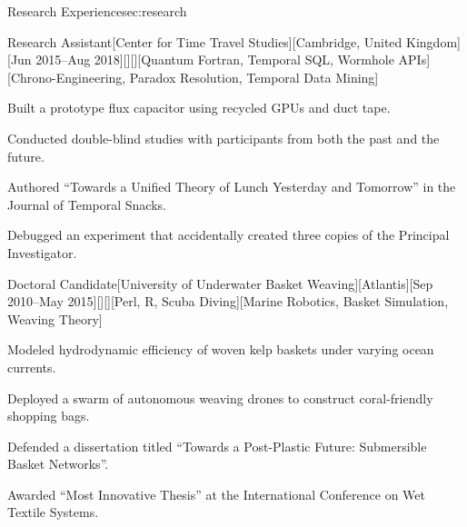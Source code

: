 \documentclass[11pt, letterpaper, extended ]{i-am-developer}
\begin{document}
\begin{devCVSection}{Research Experience}{sec:research}
  \begin{devRole}{Research Assistant}[Center for Time Travel
    Studies][Cambridge, United Kingdom][Jun 2015--Aug
    2018][\faClock][\faMapMarker][Quantum Fortran, Temporal SQL,
    Wormhole APIs][Chrono-Engineering, Paradox Resolution, Temporal Data Mining]
    \begin{devItemize}
    \item Built a prototype flux capacitor using recycled GPUs and duct tape.
    \item Conducted double-blind studies with participants from both
      the past and the future.
    \item Authored “Towards a Unified Theory of Lunch Yesterday and
      Tomorrow” in the Journal of Temporal Snacks.
    \item Debugged an experiment that accidentally created three
      copies of the Principal Investigator.
    \end{devItemize}
  \end{devRole}

  \begin{devRole}{Doctoral Candidate}[University of Underwater Basket
    Weaving][Atlantis][Sep 2010--May
    2015][\faGraduationCap][\faMapMarker][Perl, R, Scuba
    Diving][Marine Robotics, Basket Simulation, Weaving Theory]
    \begin{devItemize}
    \item Modeled hydrodynamic efficiency of woven kelp baskets under
      varying ocean currents.
    \item Deployed a swarm of autonomous weaving drones to construct
      coral-friendly shopping bags.
    \item Defended a dissertation titled “Towards a Post-Plastic
      Future: Submersible Basket Networks”.
    \item Awarded “Most Innovative Thesis” at the International
      Conference on Wet Textile Systems.
    \end{devItemize}
  \end{devRole}
\end{devCVSection}
\end{document}
